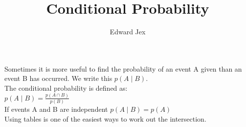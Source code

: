 \documentclass[a4paper,12pt]{article}
\begin{document}
\title{Conditional Probability}	
\author{Edward Jex}
\maketitle
Sometimes it is more useful to find the probability of an event A given than an event B has occurred. We write this $p(A \mid B)$. \\
The conditional probability is defined as: \\
$p(A \mid B) = \frac{p(A \cap B)}{p(B)}$ \\
If events A and B are independent $p(A \mid B) = p(A)$ \\
Using tables is one of the easiest ways to work out the intersection.
\end{document}
